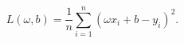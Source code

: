 \begin{equation}
    L(\omega,b) = \frac{1}{n}\sum\limits_{i=1}^n(\omega x_i + b - y_i)^2.
    \label{eq:mse}
\end{equation}
